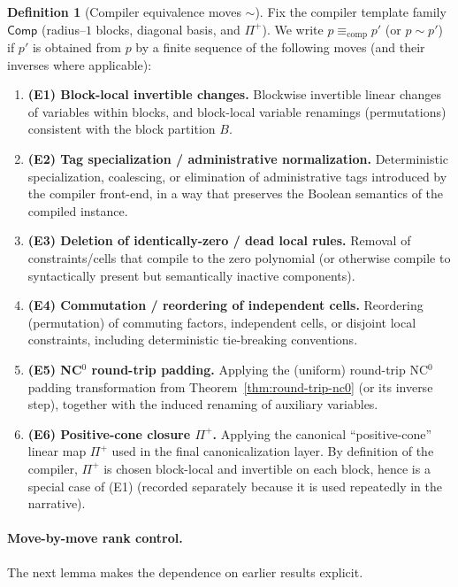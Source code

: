 \documentclass[12pt]{article}
\theoremstyle{definition}
\newtheorem{definition}{Definition}
\theoremstyle{definition}
\theoremstyle{remark}
\theoremstyle{remark}
\begin{document}
\begin{definition}[Compiler equivalence moves $\sim$]
\label{def:compiler-equivalence-moves}
Fix the compiler template family $\mathsf{Comp}$ (radius--$1$ blocks, diagonal basis, and $\Pi^+$).
We write $p \equiv_{\mathrm{comp}} p'$ (or $p \sim p'$) if $p'$ is obtained from $p$ by a finite sequence
of the following moves (and their inverses where applicable):
\begin{enumerate}
\item \textbf{(E1) Block-local invertible changes.}
Blockwise invertible linear changes of variables within blocks, and block-local
variable renamings (permutations) consistent with the block partition $B$.

\item \textbf{(E2) Tag specialization / administrative normalization.}
Deterministic specialization, coalescing, or elimination of administrative tags
introduced by the compiler front-end, in a way that preserves the Boolean semantics
of the compiled instance.

\item \textbf{(E3) Deletion of identically-zero / dead local rules.}
Removal of constraints/cells that compile to the zero polynomial (or otherwise
compile to syntactically present but semantically inactive components).

\item \textbf{(E4) Commutation / reordering of independent cells.}
Reordering (permutation) of commuting factors, independent cells, or disjoint
local constraints, including deterministic tie-breaking conventions.

\item \textbf{(E5) NC$^0$ round-trip padding.}
Applying the (uniform) round-trip NC$^0$ padding transformation from Theorem~\ref{thm:round-trip-nc0} (or its
inverse step), together with the induced renaming of auxiliary variables.

\item \textbf{(E6) Positive-cone closure $\Pi^+$.}
Applying the canonical ``positive-cone'' linear map $\Pi^+$ used in the final
canonicalization layer. By definition of the compiler, $\Pi^+$ is chosen block-local and
invertible on each block, hence is a special case of (E1) (recorded separately because it is
used repeatedly in the narrative).
\end{enumerate}
\end{definition}

\paragraph{Move-by-move rank control.}
The next lemma makes the dependence on earlier results explicit.
\end{document}
